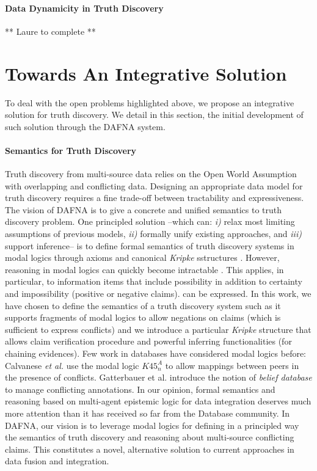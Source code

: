 \documentclass[prodmode,acmtecs]{acmsmall} %
\begin{document}
\paragraph*{Data Dynamicity in  Truth Discovery} 
** Laure to complete **

\iffalse
\section{Towards An Integrative Solution}
To deal with the open problems highlighted above, we propose an integrative solution for truth discovery.
We detail in this section, the initial development of such solution through the DAFNA system.

\paragraph*{Semantics for Truth Discovery} 

Truth discovery from multi-source data relies on the Open World Assumption with overlapping and conflicting data.
Designing an appropriate data model for truth discovery requires a fine trade-off between tractability and expressiveness. 
The vision of DAFNA is to give a concrete and unified semantics to  truth discovery problem. One principled solution --which 
can: {\it i)} relax most limiting assumptions of previous models, {\it ii)} formally unify existing approaches, and {\it iii)}
support inference-- is to define formal semantics of truth discovery systems in modal logics through axioms and canonical {\it Kripke}
sstructures \cite{GorankoOtto06}. However, reasoning in modal logics can quickly become intractable \cite{Gottlob92}. This applies, in
particular, to information items that include possibility in addition to certainty and impossibility (positive or negative claims). 
can be expressed. 
In this work, we have chosen to define the semantics of a truth discovery system such as it supports fragments of modal logics to allow
negations on claims (which is sufficient to express conflicts) and we introduce a particular {\it Kripke} structure that allows claim 
verification procedure and powerful inferring functionalities (for chaining evidences). Few work in databases have considered modal logics
before: 
Calvanese {\it et al.} \cite{CalvaneseGLLR08} use the modal logic $K45^A_n$ to allow mappings between peers in the presence of conflicts. 
Gatterbauer et al. \cite{GatterbauerBKS09} introduce the notion of {\it belief database} to manage conflicting annotations. In our opinion, 
formal semantics and reasoning based on multi-agent epistemic logic for data integration deserves much more attention than it has received 
so far from the Database community. In DAFNA, our vision is to leverage modal logics for defining in a principled way the semantics of truth 
discovery and reasoning about multi-source conflicting claims. This constitutes a novel, alternative solution to current approaches in data 
fusion and integration. 
\end{document}
